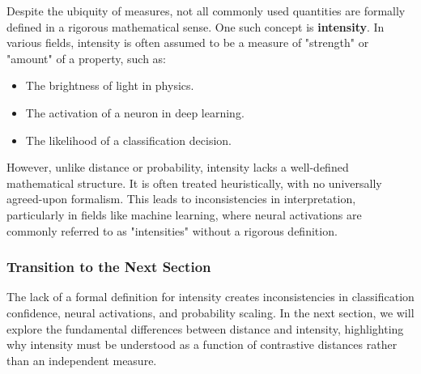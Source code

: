 Despite the ubiquity of measures, not all commonly used quantities are formally defined in a rigorous mathematical sense. One such concept is \textbf{intensity}. In various fields, intensity is often assumed to be a measure of "strength" or "amount" of a property, such as:

\begin{itemize}
    \item The brightness of light in physics.
    \item The activation of a neuron in deep learning.
    \item The likelihood of a classification decision.
\end{itemize}

However, unlike distance or probability, intensity lacks a well-defined mathematical structure. It is often treated heuristically, with no universally agreed-upon formalism. This leads to inconsistencies in interpretation, particularly in fields like machine learning, where neural activations are commonly referred to as "intensities" without a rigorous definition.


\subsubsection{Transition to the Next Section}

The lack of a formal definition for intensity creates inconsistencies in classification confidence, neural activations, and probability scaling. In the next section, we will explore the fundamental differences between distance and intensity, highlighting why intensity must be understood as a function of contrastive distances rather than an independent measure.
